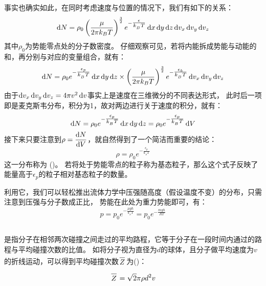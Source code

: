             事实也确实如此，在同时考虑速度与位置的情况下，我们有如下的关系：
            \begin{equation}
                \dif{N}=\rho_{0}\left(\frac \mu{2\pi k_{B}T}\right)^{\frac{3}{2}}e^{-\tfrac{\epsilon}{k_{_B}T}}
                \dif{x}\dif{y}\dif{z}\dif{v_{x}}\dif{v_{y}}\dif{v_{z}}
                \nonumber
            \end{equation}
            其中$\rho_{0}$为势能零点处的分子数密度。
            仔细观察可见，若将内能拆成势能与动能的和，再分别与对应的变量组合，就有：
            \begin{equation}
                \dif{N} =\rho_{0}e^{-\tfrac{\epsilon_{p}}{k_{_B}T}}\dif{x}\dif{y}\dif{z}\times\left(\frac \mu{2\pi k_{B}T}\right)^{\frac{3}{2}}e^{-\tfrac{\epsilon_{k}}{k_{_B}T}}
                \dif{v_{x}}\dif{v_{y}}\dif{v_{z}}
                \nonumber
            \end{equation}
            由于$\dif{v_{x}}\dif{v_{y}}\dif{v_{z}}=4\pi v^{2}\dif{v}$事实上是速度在三维微分的不同表达形式，
            此时后一项即是麦克斯韦分布，积分为1，故对两边进行关于速度的积分，就有：
            \begin{equation}
                \dif{N} =\rho_{0}e^{-\tfrac{\epsilon_{p}}{k_{_B}T}}\dif{x}\dif{y}\dif{z} =\rho_{0}e^{-\tfrac{\epsilon_{p}}{k_{_B}T}}\dif{V}
                \nonumber
            \end{equation}
            接下来只要注意到$\rho = \dfrac{\dif{N}}{\dif{V}}$，就自然得到了一个简洁而重要的结论：
            \begin{equation}
                \rho = \rho_{0}e^{-\tfrac{\epsilon_{p}}{k_{_B}T}}
                \nonumber
            \end{equation}
            这一分布称为 ()。
            若将处于势能零点的粒子称为基态粒子，那么这个式子反映了能量高于$\epsilon_{p}$的粒子相对基态粒子的数量。
            
            利用它，我们可以轻松推出流体力学中压强随高度（假设温度不变）的分布，只需注意到压强与分子数成正比，
            势能在此处为重力势能即可，有：
            \begin{equation}
                p = p_{0}e^{-\tfrac{\mu gh}{k_{_B}T}} = p_{0}e^{-\tfrac{mgh}{RT}}
                \nonumber    
            \end{equation}
        \subsection[平均自由程]{}
             是指分子在相邻两次碰撞之间走过的平均路程，它等于分子在一段时间内通过的路程与平均碰撞次数的比值。
            如将分子视为直径为$d$的球体，且分子做平均速度为$v$的折线运动，可以得到平均碰撞次数$\upperline{Z}$为()：
            \begin{equation}
                \upperline{Z} = \sqrt{2}\pi \rho d^{2} v
                \nonumber
            \end{equation}

